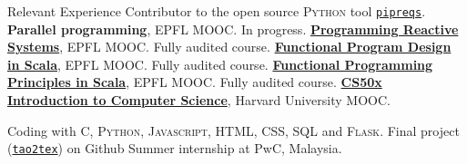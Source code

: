 \begin{rubric}{Relevant Experience}
\entry*[2023] Contributor to the open source \textsc{Python} tool \href{https://github.com/bndr/pipreqs}{\texttt{pipreqs}}.
\entry*[2023] \textbf{Parallel programming}, EPFL MOOC. In progress.
\entry*[2023] \href{https://www.coursera.org/learn/scala-akka-reactive/}{\textbf{Programming Reactive Systems}}, EPFL MOOC. Fully audited course.
\entry*[2023] \href{https://www.coursera.org/learn/scala-functional-program-design/}{\textbf{Functional Program Design in Scala}}, EPFL MOOC. Fully audited course.
\entry*[2022] \href{https://www.coursera.org/learn/scala-functional-programming/}{\textbf{Functional Programming Principles in Scala}}, EPFL MOOC. Fully audited course.
\entry*[2022] \href{https://certificates.cs50.io/61d7b5aa-582d-49e7-ada4-c7cd0b965c9b.pdf?size=letter}{\textbf{CS50x Introduction to Computer Science}}, Harvard University MOOC. \par Coding with \textsc{C, Python, Javascript, HTML, CSS, SQL} and \textsc{Flask}. Final project (\href{https://github.com/clvnkhr/tao2tex}{\texttt{tao2tex}}) on Github
\entry*[2015] Summer internship at PwC, Malaysia.
%


\end{rubric}
